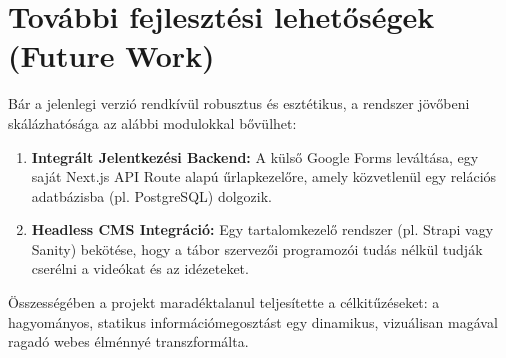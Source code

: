 \documentclass[12pt, a4paper]{report}
\begin{document}
\section{További fejlesztési lehetőségek (Future Work)}
Bár a jelenlegi verzió rendkívül robusztus és esztétikus, a rendszer jövőbeni skálázhatósága az alábbi modulokkal bővülhet:
\begin{enumerate}
    \item \textbf{Integrált Jelentkezési Backend:} A külső Google Forms leváltása, egy saját Next.js API Route alapú űrlapkezelőre, amely közvetlenül egy relációs adatbázisba (pl. PostgreSQL) dolgozik.
    \item \textbf{Headless CMS Integráció:} Egy tartalomkezelő rendszer (pl. Strapi vagy Sanity) bekötése, hogy a tábor szervezői programozói tudás nélkül tudják cserélni a videókat és az idézeteket.
\end{enumerate}

Összességében a projekt maradéktalanul teljesítette a célkitűzéseket: a hagyományos, statikus információmegosztást egy dinamikus, vizuálisan magával ragadó webes élménnyé transzformálta.
\end{document}
